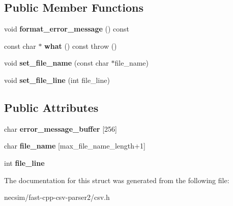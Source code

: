 \subsection*{Public Member Functions}
\begin{DoxyCompactItemize}
\item 
void {\bfseries format\+\_\+error\+\_\+message} () const \hypertarget{structio_1_1error_1_1line__length__limit__exceeded_aa7c12639e9f39f04ff1c8a53e8e41a06}{}\label{structio_1_1error_1_1line__length__limit__exceeded_aa7c12639e9f39f04ff1c8a53e8e41a06}

\item 
const char $\ast$ {\bfseries what} () const   throw ()\hypertarget{structio_1_1error_1_1base_ad99d4a2459e51ce2c24707569c4a0df6}{}\label{structio_1_1error_1_1base_ad99d4a2459e51ce2c24707569c4a0df6}

\item 
void {\bfseries set\+\_\+file\+\_\+name} (const char $\ast$file\+\_\+name)\hypertarget{structio_1_1error_1_1with__file__name_ae765de62778c989d4658b4efe2995390}{}\label{structio_1_1error_1_1with__file__name_ae765de62778c989d4658b4efe2995390}

\item 
void {\bfseries set\+\_\+file\+\_\+line} (int file\+\_\+line)\hypertarget{structio_1_1error_1_1with__file__line_aa92778a81778abc676ec6ee9952bba8c}{}\label{structio_1_1error_1_1with__file__line_aa92778a81778abc676ec6ee9952bba8c}

\end{DoxyCompactItemize}
\subsection*{Public Attributes}
\begin{DoxyCompactItemize}
\item 
char {\bfseries error\+\_\+message\+\_\+buffer} \mbox{[}256\mbox{]}\hypertarget{structio_1_1error_1_1base_a8e38f86a7afea1f0c6e6cac0c548d6f2}{}\label{structio_1_1error_1_1base_a8e38f86a7afea1f0c6e6cac0c548d6f2}

\item 
char {\bfseries file\+\_\+name} \mbox{[}max\+\_\+file\+\_\+name\+\_\+length+1\mbox{]}\hypertarget{structio_1_1error_1_1with__file__name_ac957d5590a8b95517b74eb5bf373a424}{}\label{structio_1_1error_1_1with__file__name_ac957d5590a8b95517b74eb5bf373a424}

\item 
int {\bfseries file\+\_\+line}\hypertarget{structio_1_1error_1_1with__file__line_a391298c37172bcdb83aeb3daf65d5a0e}{}\label{structio_1_1error_1_1with__file__line_a391298c37172bcdb83aeb3daf65d5a0e}

\end{DoxyCompactItemize}


The documentation for this struct was generated from the following file\+:\begin{DoxyCompactItemize}
\item 
necsim/fast-\/cpp-\/csv-\/parser2/csv.\+h\end{DoxyCompactItemize}

